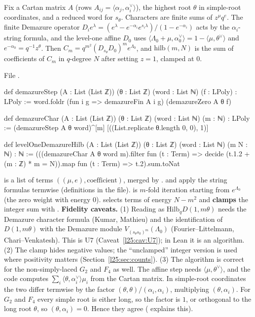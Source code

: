 \begin{definition}\label{l25:def:demazure}
Fix a Cartan matrix $A$ (rows $A_{ij}=\langle\alpha_j,\alpha_i^\vee\rangle$), the highest root $\theta$ in simple-root
coordinates, and a reduced word for $s_\theta$. Characters are finite sums of $z^\mu q^e$. The finite Demazure operator
$D_i e^\lambda=(e^\lambda-e^{-\alpha_i}e^{s_i\lambda})/(1-e^{-\alpha_i})$ acts by the $\alpha_i$-string formula, and the
level-one affine $D_0$ uses $\langle\Lambda_0+\mu,\alpha_0^\vee\rangle=1-\langle\mu,\theta^\vee\rangle$ and
$e^{-\alpha_0}=q^{-1}z^\theta$. Then $C_m=q^{m^2}(D_{s_\theta}D_0)^m e^{\Lambda_0}$, and
$\mathrm{hilb}(m,N)$ is the sum of coefficients of $C_m$ in $q$-degree $N$ after setting $z=1$, clamped at $0$.
\end{definition}
\noindent File .
\begin{leancode}
def demazureStep (A : List (List ℤ)) (θ : List ℤ) (word : List ℕ) (f : LPoly) : LPoly :=
  word.foldr (fun i g => demazureFin A i g) (demazureZero A θ f)

def demazureChar (A : List (List ℤ)) (θ : List ℤ) (word : List ℕ) (m : ℕ) : LPoly :=
  (demazureStep A θ word)^[m] [((List.replicate θ.length 0, 0), 1)]

def levelOneDemazureHilb (A : List (List ℤ)) (θ : List ℤ) (word : List ℕ) (m N : ℕ) : ℕ :=
  (((demazureChar A θ word m).filter fun (t : Term) => decide (t.1.2 + (m : ℤ) * m = N)).map
    fun (t : Term) => t.2).sum.toNat
\end{leancode}
\begin{dictionary}
 is a list of terms $((\mu,e),\text{coefficient})$, merged by . 
and  apply the string formulas termwise (definitions in the file).  is $m$-fold
iteration starting from $e^{\Lambda_0}$ (the zero weight with energy $0$).  selects terms of
energy $N-m^2$ and \textbf{clamps} the integer sum with . \textbf{Fidelity caveats.} (1) Reading
 as $\mathrm{Hilb}_qD(1,m\theta)$ needs the Demazure character formula
(Kumar, Mathieu) and the identification of $D(1,m\theta)$ with the Demazure module $V_{(s_\theta s_0)^m}(\Lambda_0)$
(Fourier--Littelmann, Chari--Venkatesh). This is U7 (Caveat~\ref{l25:cav:U7}); in Lean it is an algorithm. (2) The clamp
hides negative values; the ``unclamped'' integer version  is used where positivity matters
(Section~\ref{l25:sec:counts}). (3) The algorithm is correct for the non-simply-laced $G_2$ and $F_4$ as well. The
affine step needs $\langle\mu,\theta^\vee\rangle$, and the code computes $\sum_i\langle\theta,\alpha_i^\vee\rangle\mu_i$
from the Cartan matrix. In simple-root coordinates the two differ termwise by the factor
$(\theta,\theta)/(\alpha_i,\alpha_i)$, multiplying $(\theta,\alpha_i)$. For $G_2$ and $F_4$ every simple root is either
long, so the factor is $1$, or orthogonal to the long root $\theta$, so $(\theta,\alpha_i)=0$. Hence they agree
( explains this).
\end{dictionary}
